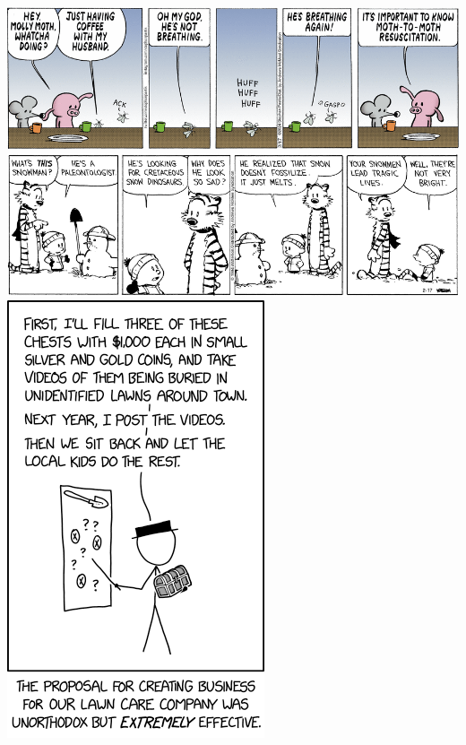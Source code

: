 \documentclass[landscape]{article}
\begin{document}
\begin{multicols}{3}
\center\includegraphics[width=\linewidth]{images/comic-pearls.png}
\center\includegraphics[width=\linewidth]{images/comic-calvinandhobbes.png}
\center\includegraphics[height=0.75\linewidth]{images/comic-xkcd.png}

\end{multicols}
\end{document}
